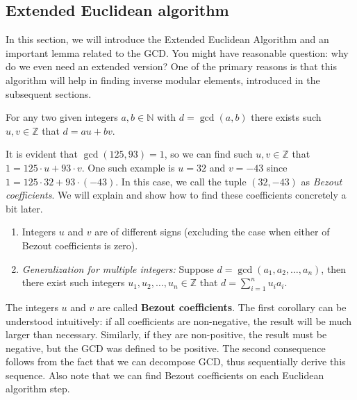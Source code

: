 \documentclass[../lecture-notes-148x210.tex]{subfiles}
\begin{document}
\subsection{Extended Euclidean algorithm}

In this section, we will introduce the Extended Euclidean Algorithm and an
important lemma related to the GCD. You might have reasonable question: why do
we even need an extended version? One of the primary reasons is that this 
algorithm will help in finding inverse modular elements, introduced in the 
subsequent sections.

\begin{lemma}  \label{lemma:bezout_identity}
    For any two given integers $a, b \in \mathbb{N}$ with $d = \gcd(a, b)$ there exists such 
    $u, v \in \mathbb{Z}$ that $d = au + bv$.
\end{lemma}

\begin{example}
    It is evident that $\gcd(125, 93) = 1$, so we can find such $u, v \in
    \mathbb{Z}$ that $1 = 125 \cdot u + 93 \cdot v$. One such example is $u =
    32$ and $v = -43$ since $1 = 125 \cdot 32 + 93 \cdot (-43)$. In this case,
    we call the tuple $(32,-43)$ as \textit{Bezout coefficients}. We will explain and show
    how to find these coefficients concretely a bit later.
\end{example}

\begin{corollary} 
    \hfill
    \begin{enumerate}
        \item Integers $u$ and $v$ are of different signs (excluding the case when either of Bezout coefficients is zero).
        \item \textit{Generalization for multiple integers:} Suppose $d = \gcd(a_1, a_2, \dots, a_n)$, then there 
        exist such integers $u_1, u_2, \dots, u_n \in \mathbb{Z}$ that $d = \sum_{i=1}^nu_ia_i$.
    \end{enumerate}    
\end{corollary}

The integers $u$ and $v$ are called \textbf{Bezout coefficients}. The first
corollary can be understood intuitively: if all coefficients are non-negative,
the result will be much larger than necessary. Similarly, if they are
non-positive, the result must be negative, but the GCD was defined to be
positive. The second consequence follows from the fact that we can decompose
GCD, thus sequentially derive this sequence. Also note that we can find Bezout
coefficients on each Euclidean algorithm step.
\end{document}
